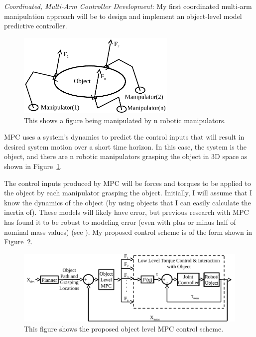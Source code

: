\documentclass[12pt, letterpaper]{article}
\begin{document}
\textit{Coordinated, Multi-Arm Controller Development}: My first coordinated multi-arm manipulation approach will be to design and implement an object-level model predictive controller. 
\begin{figure}
   \centering
   \includegraphics[trim = 0mm 0mm 0mm 0mm,clip,width=3in]{object_level_control_figure.pdf}
   \caption{This shows a figure being manipulated by n robotic manipulators.}
   \label{fig:object_control}
\end{figure}
MPC uses a system's dynamics to predict the control inputs that will result in desired system motion over a short time horizon. In this case, the system is the object, and there are n robotic manipulators grasping the object in 3D space as shown in Figure~\ref{fig:object_control}. 

The control inputs produced by MPC will be forces and torques to be applied to the object by each manipulator grasping the object. Initially, I will assume that I know the dynamics of the object (by using objects that I can easily calculate the inertia of). These models will likely have error, but previous research with MPC has found it to be robust to modeling error (even with plus or minus half of nominal mass values) (see \cite{killpack2013fast, killpack2013model}). My proposed control scheme is of the form shown in Figure~\ref{fig:control_diagram}. 

\begin{figure}[htbp] %
   \centering
   \includegraphics[trim = 0mm 0mm 0mm 0mm,clip,width=6.5in]{control_block_diagram_smaller.pdf}
   \caption{This figure shows the proposed object level MPC control scheme.}
   \label{fig:control_diagram}
\end{figure}
\end{document}
